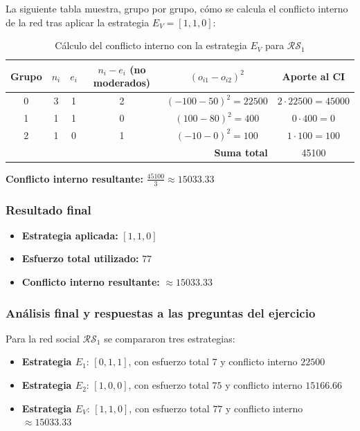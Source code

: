 \documentclass[11pt,letter]{article}
\begin{document}
La siguiente tabla muestra, grupo por grupo, cómo se calcula el conflicto interno de la red tras aplicar la estrategia $E_V = [1, 1, 0]$:

\begin{table}[H]
\centering
\begin{tabular}{c|c|c|c|c|c}
\textbf{Grupo} & $n_i$ & $e_i$ & $n_i - e_i$ (no moderados) & $(o_{i1} - o_{i2})^2$ & Aporte al CI \\
\hline
0 & 3 & 1 & 2 & $(-100 - 50)^2 = 22500$ & $2 \cdot 22500 = 45000$ \\
1 & 1 & 1 & 0 & $(100 - 80)^2 = 400$ & $0 \cdot 400 = 0$ \\
2 & 1 & 0 & 1 & $(-10 - 0)^2 = 100$ & $1 \cdot 100 = 100$ \\
\hline
\multicolumn{5}{r|}{\textbf{Suma total}} & 45100 \\
\end{tabular}
\caption{Cálculo del conflicto interno con la estrategia $E_V$ para $\mathcal{RS}_1$}
\end{table}

\textbf{Conflicto interno resultante:} $\frac{45100}{3} \approx 15033.33$

\subsubsection*{Resultado final}

\begin{itemize}
    \item \textbf{Estrategia aplicada:} $[1, 1, 0]$
    \item \textbf{Esfuerzo total utilizado:} $77$
    \item \textbf{Conflicto interno resultante:} $\approx 15033.33$
\end{itemize}

\subsubsection*{Análisis final y respuestas a las preguntas del ejercicio}

Para la red social $\mathcal{RS}_1$ se compararon tres estrategias:

\begin{itemize}
    \item \textbf{Estrategia $E_1$}: $[0, 1, 1]$, con esfuerzo total $7$ y conflicto interno $22500$
    \item \textbf{Estrategia $E_2$}: $[1, 0, 0]$, con esfuerzo total $75$ y conflicto interno $15166.66$
    \item \textbf{Estrategia $E_V$}: $[1, 1, 0]$, con esfuerzo total $77$ y conflicto interno $\approx 15033.33$
\end{itemize}
\end{document}
